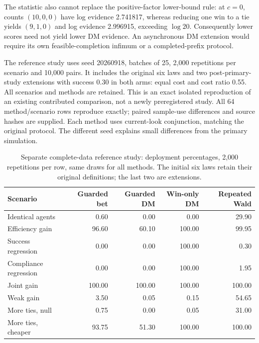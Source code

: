 The statistic also cannot replace the positive-factor lower-bound rule:
at $c=0$, counts $(10,0,0)$ have log evidence 2.741817, whereas reducing
one win to a tie yields $(9,1,0)$ and log evidence 2.996915, exceeding
$\log20$. Consequently lower scores need not yield lower DM evidence.
An asynchronous DM extension would require its own feasible-completion
infimum or a completed-prefix protocol.

The reference study uses seed 20260918, batches of 25, 2,000 repetitions
per scenario and 10,000 pairs. It includes the original six laws and two
post-primary-study extensions with success 0.30 in both arms: equal cost
and cost ratio 0.55. All scenarios and methods are retained. This is an
exact isolated reproduction of an existing contributed comparison,
not a newly preregistered study. All 64 method/scenario rows reproduce
exactly; paired sample-use differences and source hashes are supplied.
Each method uses current-look conjunction, matching the original protocol.
The different seed explains small differences from the primary simulation.

\begin{table}[h]
\centering\small
\caption{Separate complete-data reference study: deployment percentages,
2,000 repetitions per row, same draws for all methods. The initial six
laws retain their original definitions; the last two are extensions.}
\begin{tabular}{lrrrr}
\toprule
Scenario & Guarded bet & Guarded DM & Win-only DM & Repeated Wald\\
\midrule
Identical agents & 0.60 & 0.00 & 0.00 & 29.90 \\
Efficiency gain & 96.60 & 60.10 & 100.00 & 99.95 \\
Success regression & 0.00 & 0.00 & 100.00 & 0.30 \\
Compliance regression & 0.00 & 0.00 & 100.00 & 1.95 \\
Joint gain & 100.00 & 100.00 & 100.00 & 100.00 \\
Weak gain & 3.50 & 0.05 & 0.15 & 54.65 \\
More ties, null & 0.75 & 0.00 & 0.05 & 31.00 \\
More ties, cheaper & 93.75 & 51.30 & 100.00 & 100.00 \\
\bottomrule
\end{tabular}
\end{table}
